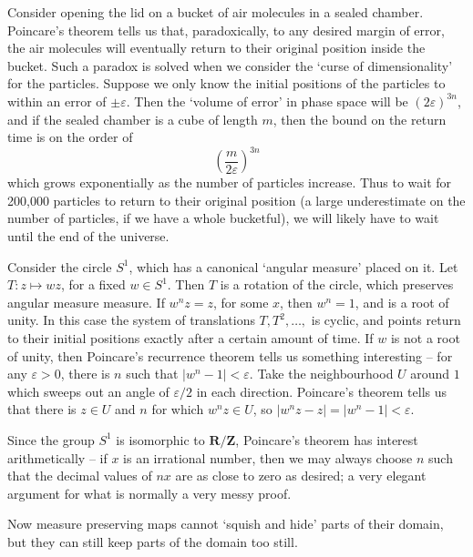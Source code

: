 \begin{example}
    Consider opening the lid on a bucket of air molecules in a sealed chamber. Poincare's theorem tells us that, paradoxically, to any desired margin of error, the air molecules will eventually return to their original position inside the bucket. Such a paradox is solved when we consider the `curse of dimensionality' for the particles. Suppose we only know the initial positions of the particles to within an error of $\pm \varepsilon$. Then the `volume of error' in phase space will be $(2\varepsilon)^{3n}$, and if the sealed chamber is a cube of length $m$, then the bound on the return time is on the order of
    \[ \left( \frac{m}{2\varepsilon} \right)^{3n} \]
    which grows exponentially as the number of particles increase. Thus to wait for 200,000 particles to return to their original position (a large underestimate on the number of particles, if we have a whole bucketful), we will likely have to wait until the end of the universe.
\end{example}

\begin{example}
    Consider the circle $S^1$, which has a canonical `angular measure' placed on it. Let $T:z \mapsto wz$, for a fixed $w \in S^1$. Then $T$ is a rotation of the circle, which preserves angular measure measure. If $w^n z = z$, for some $x$, then $w^n = 1$, and is a root of unity. In this case the system of translations $T, T^2, \dots,$ is cyclic, and points return to their initial positions exactly after a certain amount of time. If $w$ is not a root of unity, then Poincare's recurrence theorem tells us something interesting -- for any $\varepsilon > 0$, there is $n$ such that $|w^n - 1| < \varepsilon$. Take the neighbourhood $U$ around $1$ which sweeps out an angle of $\varepsilon/2$ in each direction. Poincare's theorem tells us that there is $z \in U$ and $n$ for which $w^n z \in U$, so $|w^n z - z| = |w^n - 1| < \varepsilon$.

    Since the group $S^1$ is isomorphic to $\mathbf{R}/\mathbf{Z}$, Poincare's theorem has interest arithmetically -- if $x$ is an irrational number, then we may always choose $n$ such that the decimal values of $nx$ are as close to zero as desired; a very elegant argument for what is normally a very messy proof.
\end{example}

Now measure preserving maps cannot `squish and hide' parts of their domain, but they can still keep parts of the domain too still. 

